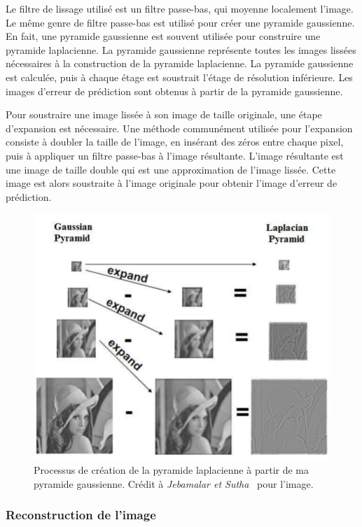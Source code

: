 \bigskip

Le filtre de lissage utilisé est un filtre passe-bas, qui moyenne localement l'image. Le même genre de filtre passe-bas est utilisé pour créer une pyramide gaussienne. En fait, une pyramide gaussienne est souvent utilisée pour construire une pyramide laplacienne. La pyramide gaussienne représente toutes les images lissées nécessaires à la construction de la pyramide laplacienne. La pyramide gaussienne est calculée, puis à chaque étage est soustrait l'étage de résolution inférieure. Les images d'erreur de prédiction sont obtenus à partir de la pyramide gaussienne.

\bigskip

Pour soustraire une image lissée à son image de taille originale, une étape d'expansion est nécessaire. Une méthode communément utilisée pour l'expansion consiste à doubler la taille de l'image, en insérant des zéros entre chaque pixel, puis à appliquer un filtre passe-bas à l'image résultante. L'image résultante est une image de taille double qui est une approximation de l'image lissée. Cette image est alors soustraite à l'image originale pour obtenir l'image d'erreur de prédiction.

\begin{figure}
    \centering
    \includegraphics[width=.75\textwidth]{contenu/resources/images/gauss_laplace_pyramid}
    \caption[Relation entre pyramide gaussienne et laplacienne]{Processus de création de la pyramide laplacienne à partir de ma pyramide gaussienne. Crédit à \textit{Jebamalar et Sutha}~\cite{jebamalar_design_2014} pour l'image.}
    \label{fig:gauss-laplace-pyramid}
\end{figure}

\subsubsection{Reconstruction de l'image}

